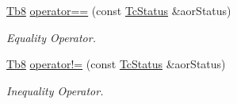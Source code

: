 \begin{DoxyCompactItemize}
\mbox{\hyperlink{namespace_g_n_common_a8115dc7ed53b6e5b52e6bfde1632ea74}{Tb8}} \mbox{\hyperlink{class_g_n_common_1_1_n_notification_1_1_tc_status_acf4e836982c2da53ad1e6989af623c58}{operator==}} (const \mbox{\hyperlink{class_g_n_common_1_1_n_notification_1_1_tc_status}{Tc\+Status}} \&aor\+Status)
\begin{DoxyCompactList}\small\item\em Equality Operator. \end{DoxyCompactList}\item 
\mbox{\hyperlink{namespace_g_n_common_a8115dc7ed53b6e5b52e6bfde1632ea74}{Tb8}} \mbox{\hyperlink{class_g_n_common_1_1_n_notification_1_1_tc_status_acdf1eba6040e3cd5e244e21524ff0d86}{operator!=}} (const \mbox{\hyperlink{class_g_n_common_1_1_n_notification_1_1_tc_status}{Tc\+Status}} \&aor\+Status)
\begin{DoxyCompactList}\small\item\em Inequality Operator. \end{DoxyCompactList}\end{DoxyCompactItemize}
